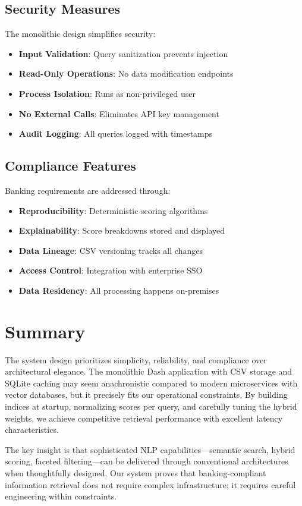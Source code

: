 \subsection{Security Measures}

The monolithic design simplifies security:

\begin{itemize}[leftmargin=*,itemsep=2pt,topsep=2pt]
  \item \textbf{Input Validation}: Query sanitization prevents injection
  \item \textbf{Read-Only Operations}: No data modification endpoints
  \item \textbf{Process Isolation}: Runs as non-privileged user
  \item \textbf{No External Calls}: Eliminates API key management
  \item \textbf{Audit Logging}: All queries logged with timestamps
\end{itemize}

\subsection{Compliance Features}

Banking requirements are addressed through:

\begin{itemize}[leftmargin=*,itemsep=2pt,topsep=2pt]
  \item \textbf{Reproducibility}: Deterministic scoring algorithms
  \item \textbf{Explainability}: Score breakdowns stored and displayed
  \item \textbf{Data Lineage}: CSV versioning tracks all changes
  \item \textbf{Access Control}: Integration with enterprise SSO
  \item \textbf{Data Residency}: All processing happens on-premises
\end{itemize}

\section{Summary}

The system design prioritizes simplicity, reliability, and compliance over architectural elegance. The monolithic Dash application with CSV storage and SQLite caching may seem anachronistic compared to modern microservices with vector databases, but it precisely fits our operational constraints. By building indices at startup, normalizing scores per query, and carefully tuning the hybrid weights, we achieve competitive retrieval performance with excellent latency characteristics.

The key insight is that sophisticated NLP capabilities---semantic search, hybrid scoring, faceted filtering---can be delivered through conventional architectures when thoughtfully designed. Our system proves that banking-compliant information retrieval does not require complex infrastructure; it requires careful engineering within constraints.
